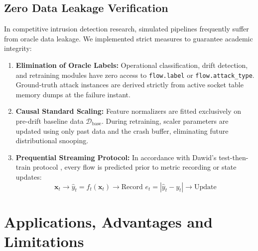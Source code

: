 \documentclass[12pt,a4paper,oneside]{report}
\begin{document}
\section{Zero Data Leakage Verification}
In competitive intrusion detection research, simulated pipelines frequently suffer from oracle data leakage. We implemented strict measures to guarantee academic integrity:
\begin{enumerate}
    \item \textbf{Elimination of Oracle Labels:} Operational classification, drift detection, and retraining modules have zero access to \texttt{flow.label} or \texttt{flow.attack\_type}. Ground-truth attack instances are derived strictly from active socket table memory dumps at the failure instant.
    \item \textbf{Causal Standard Scaling:} Feature normalizers are fitted exclusively on pre-drift baseline data $\mathcal{D}_{\text{base}}$. During retraining, scaler parameters are updated using only past data and the crash buffer, eliminating future distributional snooping.
    \item \textbf{Prequential Streaming Protocol:} In accordance with Dawid's test-then-train protocol \cite{dawid1984}, every flow is predicted prior to metric recording or state updates:
    \begin{equation}
    \mathbf{x}_t \longrightarrow \hat{y}_t = f_t(\mathbf{x}_t) \longrightarrow \text{Record } e_t = |\hat{y}_t - y_t| \longrightarrow \text{Update}
    \end{equation}
\end{enumerate}


\chapter{Applications, Advantages and Limitations}
\label{chap:applications}
\end{document}

